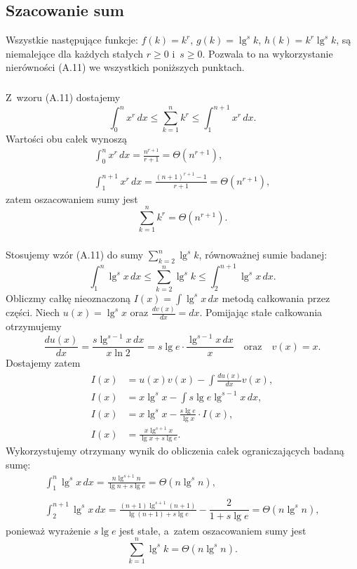 \problems

\subsection{Szacowanie sum} %
Wszystkie następujące funkcje: $f(k)=k^r$, $g(k)=\lg^sk$, $h(k)=k^r\lg^sk$, są niemalejące dla każdych stałych $r\ge0$ i~$s\ge0$. Pozwala to na wykorzystanie nierówności (A.11) we wszystkich poniższych punktach.

\subsubsection{} %
Z~wzoru (A.11) dostajemy
\[
	\int_0^nx^r\,dx \le \sum_{k=1}^nk^r \le \int_1^{n+1}x^r\,dx.
\]
Wartości obu całek wynoszą
\begin{gather*}
	\int_0^nx^r\,dx = \frac{n^{r+1}}{r+1} = \Theta(n^{r+1}), \\\\
	\int_1^{n+1}x^r\,dx = \frac{(n+1)^{r+1}-1}{r+1} = \Theta(n^{r+1}),
\end{gather*}
zatem oszacowaniem sumy jest
\[
	\sum_{k=1}^nk^r = \Theta(n^{r+1}).
\]

\subsubsection{} %
Stosujemy wzór (A.11) do sumy $\sum_{k=2}^n\lg^sk$, równoważnej sumie badanej:
\[
	\int_1^n\lg^sx\,dx \le \sum_{k=2}^n\lg^sk \le \int_2^{n+1}\lg^sx\,dx.
\]
Obliczmy całkę nieoznaczoną $I(x) = \int\lg^sx\,dx$ metodą całkowania przez części. Niech $u(x)=\lg^sx$ oraz $\frac{dv(x)}{dx}=dx$. Pomijając stałe całkowania otrzymujemy
\[
	\frac{du(x)}{dx} = \frac{s\lg^{s-1}x\,dx}{x\ln 2} = s\lg e\cdot\frac{\lg^{s-1}x\,dx}{x} \quad\text{oraz}\quad v(x) = x.
\]
Dostajemy zatem
\begin{align*}
	I(x) &= u(x)v(x)-\int\frac{du(x)}{dx}v(x), \\
	I(x) &= x\lg^sx-\int s\lg e\lg^{s-1}x\,dx, \\
	I(x) &= x\lg^sx-\frac{s\lg e}{\lg x}\cdot I(x), \\
	I(x) &= \frac{x\lg^{s+1}x}{\lg x+s\lg e}.
\end{align*}
Wykorzystujemy otrzymany wynik do obliczenia całek ograniczających badaną sumę:
\begin{gather*}
	{\int_1^n\lg^sx\,dx} = \frac{n\lg^{s+1}n}{\lg n+s\lg e} = \Theta(n\lg^sn), \\\\
	{\int_2^{n+1}\lg^sx\,dx} = \frac{(n+1)\lg^{s+1}(n+1)}{\lg(n+1)+s\lg e}-\dfrac{2}{1+s\lg e} = \Theta(n\lg^sn),
\end{gather*}
ponieważ wyrażenie $s\lg e$ jest stałe, a~zatem oszacowaniem sumy jest
\[
	\sum_{k=1}^n\lg^sk = \Theta(n\lg^sn).
\]

